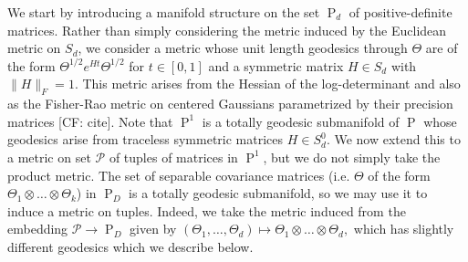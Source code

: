 \documentclass[aos]{imsart}
\theoremstyle{definition}
\newcommand{\ot}{\otimes}
\newcommand{\PD}{\operatorname{P}}
\newcommand{\smallSym}{S}
\newcommand{\SPD}{\mathcal{P}}
\newcommand{\CF}[1]{{\color{purple}[CF: #1]}}
\begin{document}
We start by introducing a manifold structure on the set $\PD_d$ of positive-definite matrices. Rather than simply considering the metric induced by the Euclidean metric on $\smallSym_d$, we consider a metric whose unit length geodesics through $\Theta$ are of the form $\Theta^{1/2} e^{Ht} \Theta^{1/2}$ for $t \in [0,1]$ and a symmetric matrix $H \in \smallSym_d$ with $\|H\|_F = 1$. This metric arises from the Hessian of the log-determinant \cite{bhatia2009positive} and also as the Fisher-Rao metric on centered Gaussians parametrized by their precision matrices \CF{cite}. Note that $\PD^1$ is a totally geodesic submanifold of $\PD$ whose geodesics arise from traceless symmetric matrices $H \in \smallSym_d^0$. We now extend this to a metric on set $\SPD$ of tuples of matrices in $\PD^1$, but we do not simply take the product metric. The set of separable covariance matrices (i.e. $\Theta$ of the form $\Theta_1 \ot \dots \ot \Theta_k$) in $\PD_D$ is a totally geodesic submanifold, so we may use it to induce a metric on tuples. Indeed, we take the metric induced from the embedding $\SPD \to \PD_D$ given by $(\Theta_1, \dots, \Theta_d) \mapsto \Theta_1 \ot \dots \ot \Theta_d,$ which has slightly different geodesics which we describe below.




\end{document}
